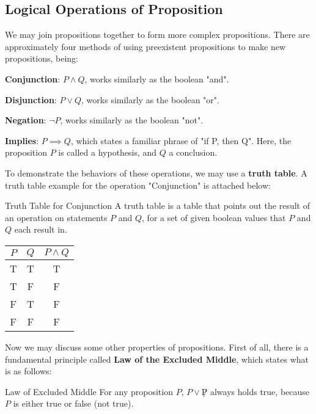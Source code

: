 \subsection{Logical Operations of Proposition}
We may join propositions together to form more complex propositions. There are approximately four methods of using preexistent propositions to make new propositions, being:
\begin{bindenum}
    \item \textbf{Conjunction}: $P \land Q$, works similarly as the boolean "and".
    \item \textbf{Disjunction}: $P \lor Q$, works similarly as the boolean "or".
    \item \textbf{Negation}: $\neg P$, works similarly as the boolean "not".
    \item \textbf{Implies}: $P \implies Q$, which states a familiar phrase of "if P, then Q". Here, the proposition $P$ is called a hypothesis, and $Q$ a conclusion.
\end{bindenum}
To demonstrate the behaviors of these operations, we may use a \textbf{truth table}. A truth table example for the operation "Conjunction" is attached below:
\begin{ln-fig}{Truth Table for Conjunction}{}
    A truth table is a table that points out the result of an operation on statements $P$ and $Q$, for a set of given boolean values that $P$ and $Q$ each result in.
    \begin{center}
        \begin{tabular}{|c c||c|}
            \hline
            $P$ & $Q$ & $P \land Q$ \\
            \hline
            T & T & T \\
            \hline
            T & F & F \\
            \hline
            F & T & F \\
            \hline
            F & F & F \\
            \hline
        \end{tabular}
    \end{center}
\end{ln-fig}
Now we may discuss some other properties of propositions. First of all, there is a fundamental principle called \textbf{Law of the Excluded Middle}, which states what is as follows:
\begin{ln-axiom}{Law of Excluded Middle}{}
    For any proposition $P$, $P \lor \not P$ always holds true, because $P$ is either true or false (not true).
\end{ln-axiom}
